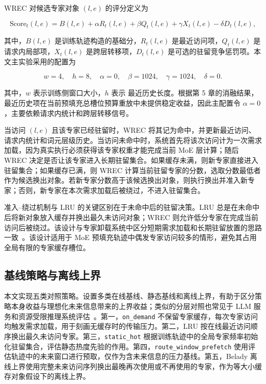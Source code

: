WREC 对候选专家对象 $(l,e)$ 的评分定义为

\begin{equation}
    \label{equ:wrec-score}
    \mathrm{Score}_t(l,e)=
    B(l,e)+
    \alpha R_t(l,e)+
    \beta Q_t(l,e)+
    \gamma X_t(l,e)-
    \delta D_t(l,e),
\end{equation}

其中，$B(l,e)$ 是训练轨迹构造的基础分，$R_t(l,e)$ 是最近访问项，$Q_t(l,e)$ 是请求内局部项，$X_t(l,e)$ 是跨层转移项，$D_t(l,e)$ 是可选的驻留竞争惩罚项。本文主实验采用的配置为

\begin{equation}
    \label{equ:wrec-main-config}
    w=4,\quad h=8,\quad
    \alpha=0,\quad
    \beta=1024,\quad
    \gamma=1024,\quad
    \delta=0.
\end{equation}

其中，$w$ 表示训练侧窗口大小，$h$ 表示 最近历史长度。根据第 5 章的消融结果，最近历史项在当前预填充总槽位预算重放中未提供稳定收益，因此主配置令 $\alpha=0$，主要依赖请求内统计和跨层转移信号。

当访问 $(l,e)$ 且该专家已经驻留时，WREC 将其记为命中，并更新最近访问、请求内统计和词元层级历史。当访问未命中时，系统首先将该次访问计为一次需求加载，因为真实执行必须获得该专家权重才能完成当前 MoE 层计算；随后 WREC 决定是否让该专家进入长期驻留集合。如果缓存未满，则新专家直接进入驻留集合；如果缓存已满，则 WREC 计算当前驻留专家的分数，选取分数最低者作为候选换出对象。若新专家分数高于该候选换出对象，则执行换出并准入新专家；否则，新专家在本次需求加载后被绕过，不进入驻留集合。

准入--绕过机制与 LRU 的关键区别在于未命中后的驻留决策。LRU 总是在未命中后将新对象放入缓存并换出最久未访问对象；WREC 则允许低分专家在完成当前访问后被绕过。该设计与专家卸载系统中区分短期需求加载和长期驻留放置的思路一致~\cite{xue2024moeinfinity,cao2025moelightning}。该设计适用于 MoE 预填充轨迹中偶发专家访问较多的情形，避免其占用全局有限的专家缓存槽位。

\subsection{基线策略与离线上界}

本文实现五类对照策略。设置多类在线基线、静态基线和离线上界，有助于区分策略本身收益与理想化未来信息带来的上界收益；类似的分层对照也常见于 LLM 服务和资源受限推理系统评估~\cite{kwon2023pagedattention,sheng2023flexgen,cao2025moelightning}。第一，\texttt{on\_demand} 不保留专家缓存，每次专家访问均触发需求加载，用于刻画无缓存时的传输压力。第二，LRU 按在线最近访问顺序换出最久未访问专家。第三，\texttt{static\_hot} 根据训练轨迹中的全局专家频率初始化驻留集合，评估静态热度先验的作用。第四，\texttt{route\_window\_prefetch} 使用评估轨迹中的未来窗口进行预取，仅作为含未来信息的压力基线。第五，Belady 离线上界使用完整未来访问序列换出最晚再次使用或不再使用的专家，作为等大小缓存对象假设下的离线上界。

